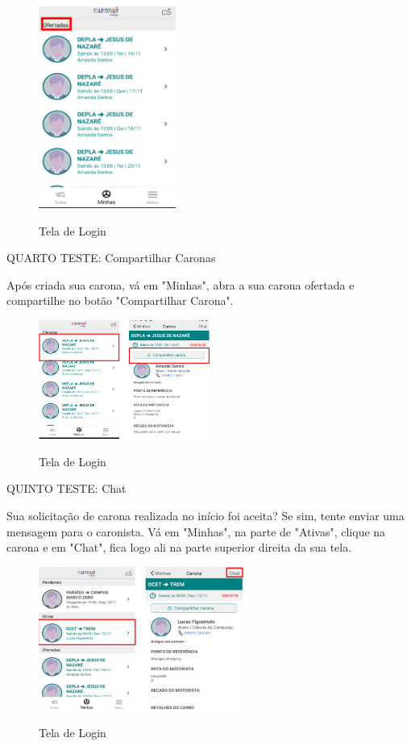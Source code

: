\begin{figure}[H]
	\centering
	\caption{Tela de Login}
	\includegraphics[width=0.4\textwidth]{./04-figuras/manual/criacao_de_carona_2.png}
	\label{fig:criacao_de_carona_2}
\end{figure}

QUARTO TESTE: Compartilhar Caronas

Após criada sua carona, vá em "Minhas", abra a sua carona ofertada e compartilhe no
botão "Compartilhar Carona".

\begin{figure}[H]
	\centering
	\caption{Tela de Login}
	\includegraphics[width=0.5\textwidth]{./04-figuras/manual/compartilhamento_de_carona.png}
	\label{fig:compartilhamento_de_carona}
\end{figure}

QUINTO TESTE: Chat

Sua solicitação de carona realizada no início foi aceita? Se sim, tente enviar uma mensagem para o caronista.
Vá em "Minhas", na parte de "Ativas", clique na carona e em "Chat", fica logo ali na parte superior direita da sua tela.

\begin{figure}[H]
	\centering
	\caption{Tela de Login}
	\includegraphics[width=0.6\textwidth]{./04-figuras/manual/chat.png}
	\label{fig:chat}
\end{figure}

